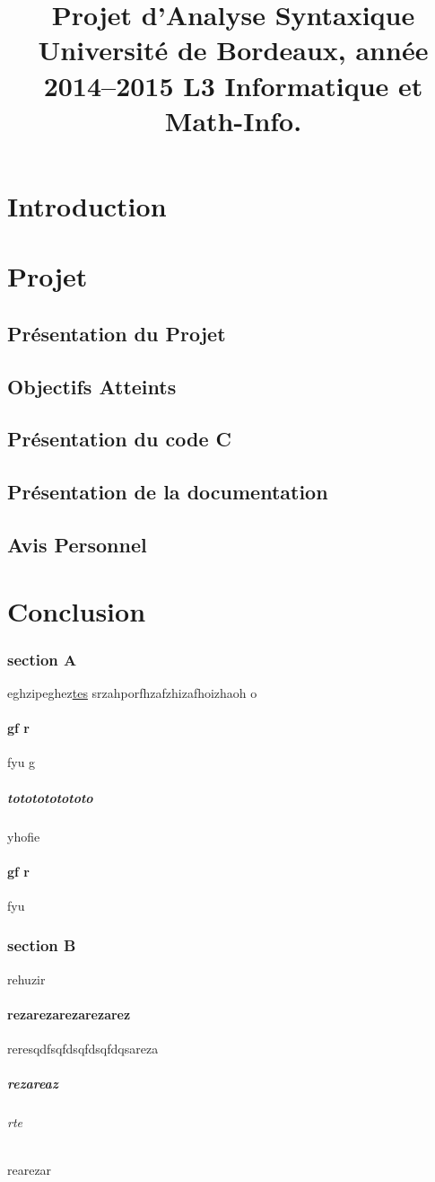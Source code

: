 \documentclass{report}
\title{Projet d’Analyse Syntaxique
Université de Bordeaux, année 2014–2015
L3 Informatique et Math-Info.}
\begin{document}
\maketitle
\tableofcontents
\part{Introduction}

\part{Projet}
\chapter{Présentation du Projet}
\chapter{Objectifs Atteints}
\chapter{Présentation du code C}
\chapter{Présentation de la documentation}
\chapter{Avis Personnel}
\part{Conclusion}
\section{section A}{eghzipeghez\underline{\color{red}tes}
srzahporfhzafzhizafhoizhaoh o\subsection{gf r}{fyu g\subsubsection{tototototototo}{yhofie}
} \subsection{gf r}{fyu}}

\section{section B}{rehuzir\subsection{rezarezarezarezarez}{reresqdfsqfds\color{red}qfdsqfdqsareza\subsubsection{rezareaz}{\paragraph{rte}{rearezar}}}}
\end{document}

